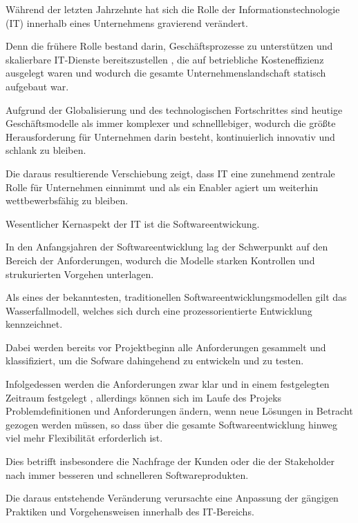 Während der letzten Jahrzehnte hat sich die Rolle der Informationstechnologie (IT) innerhalb eines Unternehmens gravierend verändert. 

Denn die frühere Rolle bestand darin, Geschäftsprozesse zu unterstützen und skalierbare IT-Dienste bereitszustellen \cite{haffke_transformative_2017}, die auf betriebliche Kosteneffizienz ausgelegt waren und wodurch die gesamte Unternehmenslandschaft statisch aufgebaut war. \cite[S. 16]{ravichandran_devops_2016}

Aufgrund der Globalisierung und des technologischen Fortschrittes sind heutige Geschäftsmodelle als immer komplexer und schnelllebiger, wodurch die größte Herausforderung für Unternehmen darin besteht, kontinuierlich innovativ und schlank zu bleiben. \cite{haffke_transformative_2017}  

Die daraus resultierende Verschiebung zeigt, dass IT eine zunehmend zentrale Rolle für Unternehmen einnimmt und als ein Enabler agiert um weiterhin wettbewerbsfähig zu bleiben. \cite{haffke_transformative_2017} 

Wesentlicher Kernaspekt der IT ist die Softwareentwickung. 

In den Anfangsjahren der Softwareentwicklung lag der Schwerpunkt auf den Bereich der Anforderungen, wodurch die Modelle starken Kontrollen und strukurierten Vorgehen unterlagen. \cite{kneuper_sixty_2017}

Als eines der bekanntesten, traditionellen Softwareentwicklungsmodellen gilt das Wasserfallmodell, welches sich durch eine prozessorientierte Entwicklung kennzeichnet. \cite{bakaji_waterfall_2012} 

Dabei werden bereits vor Projektbeginn alle Anforderungen gesammelt und klassifiziert, um die Sofware dahingehend zu entwickeln und zu testen. 

Infolgedessen werden die Anforderungen zwar klar und in einem festgelegten Zeitraum festgelegt \cite{bakaji_waterfall_2012}, allerdings können sich im Laufe des Projeks Problemdefinitionen und Anforderungen ändern, wenn neue Lösungen in Betracht gezogen werden müssen, so dass über die gesamte Softwareentwicklung hinweg viel mehr Flexibilität erforderlich ist. \cite[S. 17]{ravichandran_devops_2016}

Dies betrifft insbesondere die Nachfrage der Kunden oder die der Stakeholder nach immer besseren und schnelleren Softwareprodukten.

Die daraus entstehende Veränderung verursachte eine Anpassung der gängigen Praktiken und Vorgehensweisen innerhalb des IT-Bereichs. 

